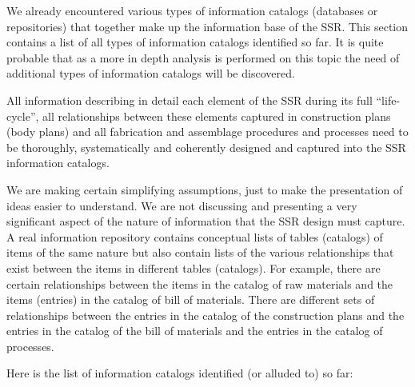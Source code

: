 \documentclass[letterpaper]{article}
\begin{document}
We already encountered various types of information catalogs (databases
or repositories) that together make up the information base of the SSR.
This section contains a list of all types of information catalogs
identified so far. It is quite probable that as a more in depth
analysis is performed on this topic the need of additional types of
information catalogs will be discovered.


\bigskip

All information describing in detail each element of the SSR during its
full “life-cycle”, all relationships between these elements captured in
construction plans (body plans) and all fabrication and assemblage
procedures and processes need to be thoroughly, systematically and
coherently designed and captured into the SSR information catalogs.


\bigskip

We are making certain simplifying assumptions, just to make the
presentation of ideas easier to understand. We are not discussing and
presenting a very significant aspect of the nature of information that
the SSR design must capture. A real information repository contains
conceptual lists of tables (catalogs) of items of the same nature but
also contain lists of the various relationships that exist between the
items in different tables (catalogs).  For example, there are certain
relationships between the items in the catalog of raw materials and the
items (entries) in the catalog of bill of materials. There are
different sets of relationships between the entries in the catalog of
the construction plans and the entries in the catalog of the bill of
materials and the entries in the catalog of processes.


\bigskip

Here is the list of information catalogs identified (or alluded to) so
far:


\bigskip
\end{document}
